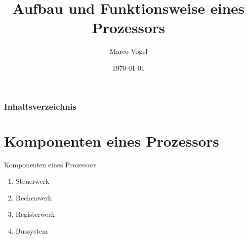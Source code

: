 \documentclass{beamer}
\title{Aufbau und Funktionsweise eines Prozessors}
\author{Marco Vogel}
\institute{Hochschule Hof}
\date{\today}
\begin{document}
\begin{frame}
\titlepage
\end{frame}

\begin{frame}
\frametitle{Inhaltsverzeichnis}
\tableofcontents
\end{frame}

\section{Komponenten eines Prozessors}
\begin{frame}{Komponenten eines Prozessors}
\begin{enumerate}
\large\item{Steuerwerk}\smallskip
\item{Rechenwerk}\smallskip
\item{Registerwerk}\smallskip
\item{Bussystem}\smallskip
\end{enumerate}
\end{frame}
\end{document}
